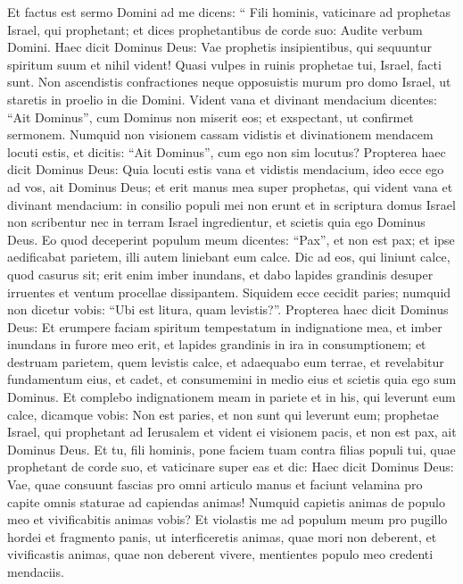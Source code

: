 \begin{biblechapter}
\begin{biblechapter}
\begin{biblechapter}
\begin{biblechapter}
\begin{biblechapter}
\begin{biblechapter}
\begin{biblechapter}
\begin{biblechapter}
\begin{biblechapter}
\begin{biblechapter}
\begin{biblechapter}
\begin{biblechapter}
\begin{biblechapter}
\verse Et factus est sermo Domini ad me dicens: 
\verse “ Fili hominis, vaticinare ad prophetas Israel, qui prophetant; et dices prophetantibus de corde suo: Audite verbum Domini. 
\verse Haec dicit Dominus Deus: Vae prophetis insipientibus, qui sequuntur spiritum suum et nihil vident! 
\verse Quasi vulpes in ruinis prophetae tui, Israel, facti sunt. 
\verse Non ascendistis confractiones neque opposuistis murum pro domo Israel, ut staretis in proelio in die Domini. 
 \verse Vident vana et divinant mendacium dicentes: “Ait Dominus”, cum Dominus non miserit eos; et exspectant, ut confirmet sermonem. 
\verse Numquid non visionem cassam vidistis et divinationem mendacem locuti estis, et dicitis: “Ait Dominus”, cum ego non sim locutus?
 \verse Propterea haec dicit Dominus Deus: Quia locuti estis vana et vidistis mendacium, ideo ecce ego ad vos, ait Dominus Deus; 
\verse et erit manus mea super prophetas, qui vident vana et divinant mendacium: in consilio populi mei non erunt et in scriptura domus Israel non scribentur nec in terram Israel ingredientur, et scietis quia ego Dominus Deus. 
\verse Eo quod deceperint populum meum dicentes: “Pax”, et non est pax; et ipse aedificabat parietem, illi autem liniebant eum calce. 
\verse Dic ad eos, qui liniunt calce, quod casurus sit; erit enim imber inundans, et dabo lapides grandinis desuper irruentes et ventum procellae dissipantem. 
\verse Siquidem ecce cecidit paries; numquid non dicetur vobis: “Ubi est litura, quam levistis?”. 
\verse Propterea haec dicit Dominus Deus: Et erumpere faciam spiritum tempestatum in indignatione mea, et imber inundans in furore meo erit, et lapides grandinis in ira in consumptionem; 
 \verse et destruam parietem, quem levistis calce, et adaequabo eum terrae, et revelabitur fundamentum eius, et cadet, et consumemini in medio eius et scietis quia ego sum Dominus.
 \verse Et complebo indignationem meam in pariete et in his, qui leverunt eum calce, dicamque vobis: Non est paries, et non sunt qui leverunt eum; \verse prophetae Israel, qui prophetant ad Ierusalem et vident ei visionem pacis, et non est pax, ait Dominus Deus.
 \verse Et tu, fili hominis, pone faciem tuam contra filias populi tui, quae prophetant de corde suo, et vaticinare super eas 
\verse et dic: Haec dicit Dominus Deus: Vae, quae consuunt fascias pro omni articulo manus et faciunt velamina pro capite omnis staturae ad capiendas animas! Numquid capietis animas de populo meo et vivificabitis animas vobis? 
\verse Et violastis me ad populum meum pro pugillo hordei et fragmento panis, ut interficeretis animas, quae mori non deberent, et vivificastis animas, quae non deberent vivere, mentientes populo meo credenti mendaciis.

\end{biblechapter}
\end{biblechapter}
\end{biblechapter}
\end{biblechapter}
\end{biblechapter}
\end{biblechapter}
\end{biblechapter}
\end{biblechapter}
\end{biblechapter}
\end{biblechapter}
\end{biblechapter}
\end{biblechapter}
\end{biblechapter}
